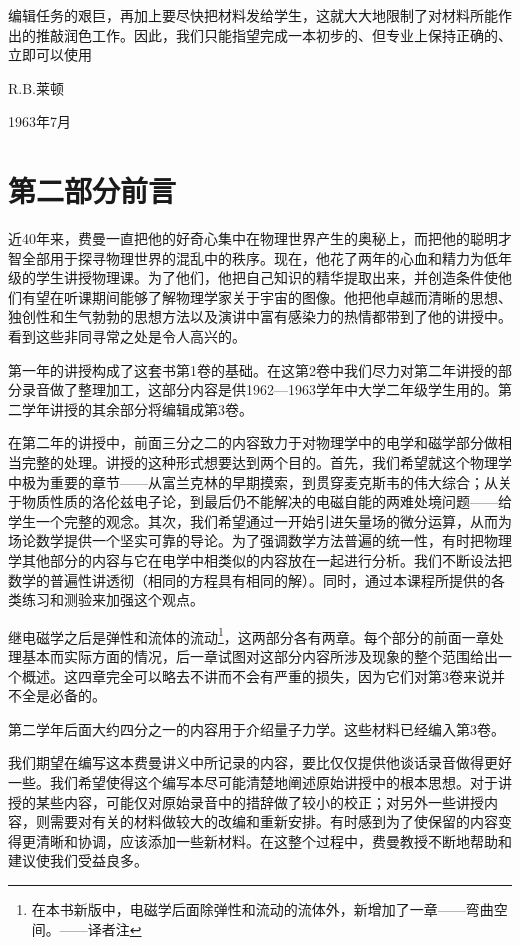 \documentclass[UTF8, 12pt, a4paper, twoside]{ctexbook}
\begin{document}
编辑任务的艰巨，再加上要尽快把材料发给学生，这就大大地限制了对材料所能作出的推敲润色工作。因此，我们只能指望完成一本初步的、但专业上保持正确的、立即可以使用

\hfill R.B.莱顿

\hfill 1963年7月

\section*{第二部分前言}

近40年来，费曼一直把他的好奇心集中在物理世界产生的奥秘上，而把他的聪明才智全部用于探寻物理世界的混乱中的秩序。现在，他花了两年的心血和精力为低年级的学生讲授物理课。为了他们，他把自己知识的精华提取出来，并创造条件使他们有望在听课期间能够了解物理学家关于宇宙的图像。他把他卓越而清晰的思想、独创性和生气勃勃的思想方法以及演讲中富有感染力的热情都带到了他的讲授中。看到这些非同寻常之处是令人高兴的。

第一年的讲授构成了这套书第1卷的基础。在这第2卷中我们尽力对第二年讲授的部分录音做了整理加工，这部分内容是供1962—1963学年中大学二年级学生用的。第二学年讲授的其余部分将编辑成第3卷。

在第二年的讲授中，前面三分之二的内容致力于对物理学中的电学和磁学部分做相当完整的处理。讲授的这种形式想要达到两个目的。首先，我们希望就这个物理学中极为重要的章节——从富兰克林的早期摸索，到贯穿麦克斯韦的伟大综合；从关于物质性质的洛伦兹电子论，到最后仍不能解决的电磁自能的两难处境问题——给学生一个完整的观念。其次，我们希望通过一开始引进矢量场的微分运算，从而为场论数学提供一个坚实可靠的导论。为了强调数学方法普遍的统一性，有时把物理学其他部分的内容与它在电学中相类似的内容放在一起进行分析。我们不断设法把数学的普遍性讲透彻（相同的方程具有相同的解）。同时，通过本课程所提供的各类练习和测验来加强这个观点。

继电磁学之后是弹性和流体的流动\footnote{在本书新版中，电磁学后面除弹性和流动的流体外，新增加了一章——弯曲空间。——译者注}，这两部分各有两章。每个部分的前面一章处理基本而实际方面的情况，后一章试图对这部分内容所涉及现象的整个范围给出一个概述。这四章完全可以略去不讲而不会有严重的损失，因为它们对第3卷来说并不全是必备的。

第二学年后面大约四分之一的内容用于介绍量子力学。这些材料已经编入第3卷。

我们期望在编写这本费曼讲义中所记录的内容，要比仅仅提供他谈话录音做得更好一些。我们希望使得这个编写本尽可能清楚地阐述原始讲授中的根本思想。对于讲授的某些内容，可能仅对原始录音中的措辞做了较小的校正；对另外一些讲授内容，则需要对有关的材料做较大的改编和重新安排。有时感到为了使保留的内容变得更清晰和协调，应该添加一些新材料。在这整个过程中，费曼教授不断地帮助和建议使我们受益良多。
\end{document}
